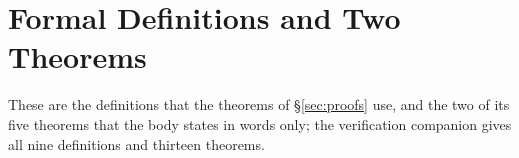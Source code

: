 \section{Formal Definitions and Two Theorems}\label{sec:formal-defs}
These are the definitions that the theorems of \S\ref{sec:proofs} use, and the
two of its five theorems that the body states in words only; the verification
companion gives all nine definitions and thirteen theorems.




